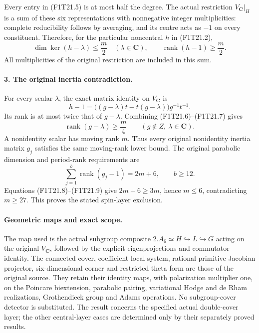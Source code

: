 Every entry in (F1T21.5) is at most half the degree.
The actual restriction $V_{\mathbf C}|_H$ is a sum
of these six representations with nonnegative integer
multiplicities: complete reducibility follows by
averaging, and its centre acts as $-1$ on every
constituent. Therefore, for the particular noncentral
$h$ in (F1T21.2),
\[
 \dim\ker(h-\lambda)\le\frac m2\quad(\lambda\in\mathbf C),
                 \qquad\operatorname{rank}(h-1)\ge\frac m2.
 \tag{F1T21.6}
\]
All multiplicities of the original restriction are
included in this sum.

\paragraph{3. The original inertia contradiction.}
For every scalar $\lambda$, the exact matrix identity
on $V_{\mathbf C}$ is
\[
 h-1=\bigl((g-\lambda)t-t(g-\lambda)\bigr)g^{-1}t^{-1}.
 \tag{F1T21.7}
\]
Its rank is at most twice that of $g-\lambda$.
Combining (F1T21.6)--(F1T21.7) gives
\[
            \operatorname{rank}(g-\lambda)\ge\frac m4
            \qquad(g\notin Z,\ \lambda\in\mathbf C).
 \tag{F1T21.8}
\]
A nonidentity scalar has moving rank $m$. Thus every
original nonidentity inertia matrix $g_j$ satisfies
the same moving-rank lower bound. The original
parabolic dimension and period-rank requirements are
\[
       \sum_{j=1}^b\operatorname{rank}(g_j-1)=2m+6,
                         \qquad b\ge12.
 \tag{F1T21.9}
\]
Equations (F1T21.8)--(F1T21.9) give
$2m+6\ge3m$, hence $m\le6$, contradicting $m\ge27$.
This proves the stated spin-layer exclusion.

\paragraph{Geometric maps and exact scope.}
The map used is the actual subgroup composite
$2.A_6\simeq H\hookrightarrow L\hookrightarrow G$
acting on the original $V_{\mathbf C}$, followed by
the explicit eigenprojections and commutator identity.
The connected cover, coefficient local system, rational
primitive Jacobian projector, six-dimensional corner
and restricted theta form are those of the original
source. They retain their identity maps, with
polarization multiplier one, on the Poincare
biextension, parabolic pairing, variational Hodge and
de Rham realizations, Grothendieck group and Adams
operations. No subgroup-cover detector is substituted.
The result concerns the specified actual double-cover
layer; the other central-layer cases are determined
only by their separately proved results.
